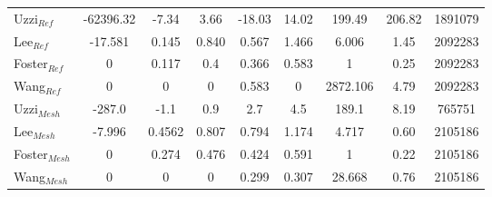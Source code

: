 \begin{table}[h]
{\begin{threeparttable}
\begin{tabular}{@{\extracolsep{5pt}}lcccccccc}
Uzzi$_{Ref}$   & -62396.32 &     -7.34 &      3.66 &   -18.03 &   14.02 &    199.49 & 206.82 & 1891079\\
Lee$_{Ref}$ & -17.581 &   0.145 &   0.840 &  0.567 & 1.466 &   6.006 & 1.45 & 2092283\\
Foster$_{Ref}$  & 0 & 0.117 & 0.4 & 0.366 & 0.583 & 1 & 0.25 & 2092283\\
Wang$_{Ref}$&  0 &    0 &    0 &   0.583 &  0 & 2872.106 & 4.79 & 2092283\\
Uzzi$_{Mesh}$ & -287.0 &   -1.1 &    0.9 &   2.7 &  4.5 &  189.1 & 8.19 & 765751\\
Lee$_{Mesh}$   & -7.996 &  0.4562 &  0.807 & 0.794 &1.174 &  4.717 & 0.60 & 2105186\\
Foster$_{Mesh}$    & 0 & 0.274 & 0.476 & 0.424 & 0.591 & 1 & 0.22 & 2105186\\
Wang$_{Mesh}$  &0 &  0 &  0 & 0.299 &0.307 & 28.668 & 0.76 & 2105186\\
\midrule
\bottomrule
\end{tabular} 
 \end{threeparttable}
 }
\end{table} 